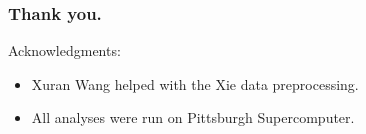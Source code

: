 \documentclass{beamer}
\begin{document}
\begin{frame}
\frametitle{Thank you.}
Acknowledgments:
\begin{itemize}
\item Xuran Wang helped with the Xie data preprocessing.
\item All analyses were run on Pittsburgh Supercomputer.
\end{itemize}
\end{frame}




\end{document}
